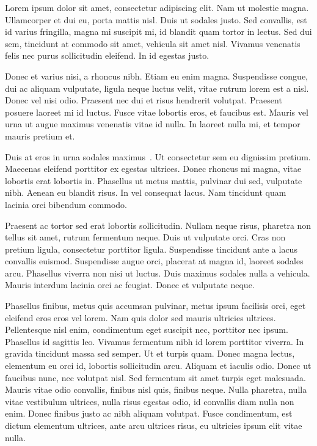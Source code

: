 
Lorem ipsum dolor sit amet, consectetur adipiscing elit. Nam ut molestie magna. Ullamcorper et dui eu, porta mattis nisl. Duis ut sodales justo. Sed convallis, est id varius fringilla, magna mi suscipit mi, id blandit quam tortor in lectus. Sed dui sem, tincidunt at commodo sit amet, vehicula sit amet nisl. Vivamus venenatis felis nec purus sollicitudin eleifend. In id egestas justo.

Donec et varius nisi, a rhoncus nibh. Etiam eu enim magna. Suspendisse congue, dui ac aliquam vulputate, ligula neque luctus velit, vitae rutrum lorem est a nisl. Donec vel nisi odio. Praesent nec dui et risus hendrerit volutpat. Praesent posuere laoreet mi id luctus. Fusce vitae lobortis eros, et faucibus est. Mauris vel urna ut augue maximus venenatis vitae id nulla. In laoreet nulla mi, et tempor mauris pretium et.

Duis at eros in urna sodales maximus~\cite{Afanasyev92}. Ut consectetur sem eu dignissim pretium. Maecenas eleifend porttitor ex egestas ultrices. Donec rhoncus mi magna, vitae lobortis erat lobortis in. Phasellus ut metus mattis, pulvinar dui sed, vulputate nibh. Aenean eu blandit risus. In vel consequat lacus. Nam tincidunt quam lacinia orci bibendum commodo.

Praesent ac tortor sed erat lobortis sollicitudin. Nullam neque risus, pharetra non tellus sit amet, rutrum fermentum neque. Duis ut vulputate orci. Cras non pretium ligula, consectetur porttitor ligula. Suspendisse tincidunt ante a lacus convallis euismod. Suspendisse augue orci, placerat at magna id, laoreet sodales arcu. Phasellus viverra non nisi ut luctus. Duis maximus sodales nulla a vehicula. Mauris interdum lacinia orci ac feugiat. Donec et vulputate neque.

Phasellus finibus, metus quis accumsan pulvinar, metus ipsum facilisis orci, eget eleifend eros eros vel lorem. Nam quis dolor sed mauris ultricies ultrices. Pellentesque nisl enim, condimentum eget suscipit nec, porttitor nec ipsum. Phasellus id sagittis leo. Vivamus fermentum nibh id lorem porttitor viverra. In gravida tincidunt massa sed semper. Ut et turpis quam. Donec magna lectus, elementum eu orci id, lobortis sollicitudin arcu. Aliquam et iaculis odio. Donec ut faucibus nunc, nec volutpat nisl. Sed fermentum sit amet turpis eget malesuada. Mauris vitae odio convallis, finibus nisl quis, finibus neque. Nulla pharetra, nulla vitae vestibulum ultrices, nulla risus egestas odio, id convallis diam nulla non enim. Donec finibus justo ac nibh aliquam volutpat. Fusce condimentum, est dictum elementum ultrices, ante arcu ultrices risus, eu ultricies ipsum elit vitae nulla.

